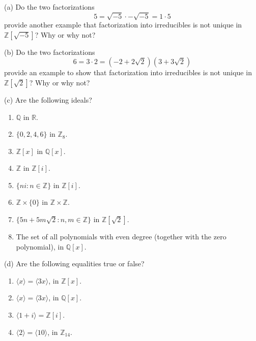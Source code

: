 \begin{problem}[Warmup]{(a)}
    Do the two factorizations \[5 = \sqrt{-5} \cdot -\sqrt{-5} = 1 \cdot 5\] provide another example that factorization into irreducibles is not unique in $\mathbb{Z}[\sqrt{-5}]$? Why or why not?
\end{problem}
\unsolved

\begin{problem}[Warmup]{(b)}
    Do the two factorizations \[6 = 3 \cdot 2 = (-2 + 2\sqrt{2})(3 + 3\sqrt{2})\] provide an example to show that factorization into irreducibles is not unique in $\mathbb{Z}[\sqrt{2}]$? Why or why not?
\end{problem}
\unsolved

\begin{problem}[Warmup]{(c)}
    Are the following ideals?
    \begin{enumerate}
        \item[(a)] $\mathbb{Q}$ in $\mathbb{R}$.
        \item[(b)] $\{0, 2, 4, 6\}$ in $\mathbb{Z}_8$.
        \item[(c)] $\mathbb{Z}[x]$ in $\mathbb{Q}[x]$.
        \item[(d)] $\mathbb{Z}$ in $\mathbb{Z}[i]$.
        \item[(e)] $\{ni : n \in \mathbb{Z}\}$ in $\mathbb{Z}[i]$.
        \item[(f)] $\mathbb{Z} \times \{0\}$ in $\mathbb{Z} \times \mathbb{Z}$.
        \item[(g)] $\{5n + 5m\sqrt{2} : n, m \in \mathbb{Z}\}$ in $\mathbb{Z}[\sqrt{2}]$.
        \item[(h)] The set of all polynomials with even degree (together with the zero polynomial), in $\mathbb{Q}[x]$.
    \end{enumerate}
\end{problem}
\unsolved

\begin{problem}[Warmup]{(d)}
    Are the following equalities true or false?
    \begin{enumerate}
        \item[(a)] $\langle x \rangle = \langle 3x \rangle$, in $\mathbb{Z}[x]$.
        \item[(b)] $\langle x \rangle = \langle 3x \rangle$, in $\mathbb{Q}[x]$.
        \item[(c)] $\langle 1 + i \rangle = \mathbb{Z}[i]$.
        \item[(d)] $\langle 2 \rangle = \langle 10 \rangle$, in $\mathbb{Z}_{14}$.
    \end{enumerate}
\end{problem}
\unsolved

